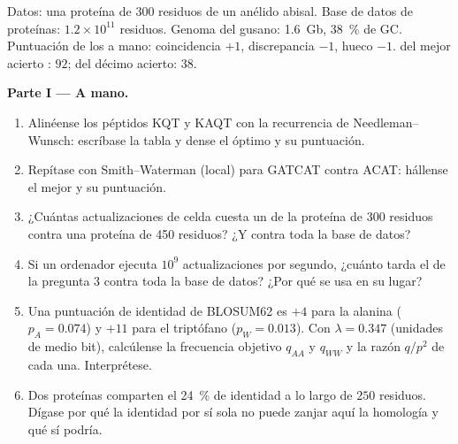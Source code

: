 \begin{problem}
\label{pb:b3:bioinformatics:1}
Datos: una proteína de \num{300} residuos de un anélido abisal. Base de
datos de proteínas: $1.2\times 10^{11}$ residuos. Genoma del gusano:
\qty{1.6}{Gb}, \qty{38}{\%} de GC. Puntuación de los  a
mano: coincidencia $+1$, discrepancia $-1$, hueco $-1$.  del mejor acierto : $92$; del décimo acierto: $38$.

\medskip
\noindent\textbf{Parte I --- A mano.}
\begin{enumerate}
  \item Alinéense los péptidos KQT y KAQT con la recurrencia de
        Needleman--Wunsch: escríbase la tabla y dense el 
        óptimo y su puntuación.
  \item Repítase con Smith--Waterman (local) para GATCAT contra ACAT:
        hállense el mejor  y su puntuación.
  \item ¿Cuántas actualizaciones de celda cuesta un 
        de la proteína de \num{300} residuos contra una proteína de
        \num{450} residuos? ¿Y contra toda la base de datos?
  \item Si un ordenador ejecuta $10^{9}$ actualizaciones por segundo,
        ¿cuánto tarda el  de la pregunta 3 contra toda la
        base de datos? ¿Por qué se usa  en su lugar?
  \item Una puntuación de identidad de BLOSUM62 es $+4$ para la alanina
        ($p_{A} =
        0.074$) y $+11$ para el triptófano ($p_{W} = 0.013$). Con
        $\lambda = 0.347$ (unidades de medio bit), calcúlense la
        frecuencia objetivo $q_{AA}$ y $q_{WW}$ y la razón $q/p^{2}$ de
        cada una. Interprétese.
  \item Dos proteínas comparten el \qty{24}{\%} de identidad a lo largo
        de $250$ residuos. Dígase por qué la identidad por sí sola no
        puede zanjar aquí la homología y qué sí podría.
\end{enumerate}


\end{problem}
